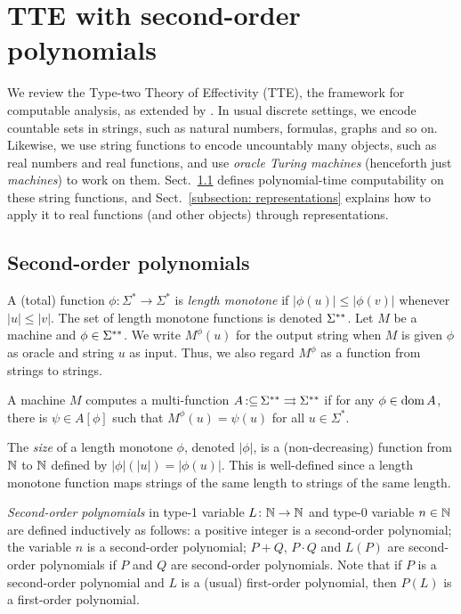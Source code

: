 \documentclass[envcountsame,orivec,oribibl]{llncs}
\newcommand{\pcolon}{\mathpunct{\,:\subseteq}}
\begin{document}
\section{TTE with second-order polynomials}
\label{section: computable analysis}

We review the Type-two Theory of Effectivity (TTE), 
the framework for computable analysis, 
as extended by 
\cite{kawamura2012complexity}. 
In usual discrete settings, we encode countable sets in strings, such as
natural numbers, formulas, graphs and so on. 
Likewise, 
we use string functions to 
encode uncountably many objects, such as real numbers and real functions, 
and use \emph{oracle Turing machines} (henceforth just \emph{machines}) 
to work on them.
Sect.~\ref{section:TTF} defines polynomial-time computability on 
these string functions, 
and Sect.~\ref{subsection: representations} explains how to 
apply it to real functions (and other objects) through representations. 

\subsection{Second-order polynomials}
\label{section:TTF}

A (total) function $\phi \colon \Sigma^* \to \Sigma^*$ is \emph{length monotone}
if $|\phi(u)| \le |\phi(v)|$ whenever $|u| \le |v|$.
The set of length monotone functions is denoted $\Sigma ^{**}$.
Let $M$ be a machine and $\phi \in \Sigma ^{**}$. 
We write $M ^\phi (u)$ for the output string 
when $M$ is given
$\phi$ as oracle and string $u$ as input.
Thus, we also regard $M^\phi$ as a function from strings to strings.

\begin{definition}
 A machine $M$ computes a multi-function $A \pcolon \LM \rightrightarrows \LM$ if for any
 $\phi \in \mathop{\rm dom} A$, there is $\psi \in A[\phi]$ such that $M^\phi(u) = \psi(u)$ for all $u \in \Sigma^*$.
\end{definition}

The \emph{size} of a length monotone $\phi$, denoted $|\phi|$,
is a (non-decreasing) function from $\mathbb N$ to $\mathbb N$ defined by 
$|\phi|(|u|) = |\phi(u)|$.
This is well-defined since a length monotone function maps 
strings of the same length to strings of the same length.

\emph{Second-order polynomials} in type-1 variable $L \colon \mathbb N \to \mathbb N$
and type-0 variable $n \in \mathbb N$ 
are defined inductively as follows:
a positive integer is a second-order polynomial;
the variable $n$ is a second-order polynomial;
$P+Q$, $P \cdot Q$ and $L(P)$ are
second-order polynomials if $P$ and $Q$ are second-order polynomials.
Note that if $P$ is a second-order polynomial and $L$ is a (usual) first-order
polynomial, then $P(L)$ is a first-order polynomial.
\end{document}

